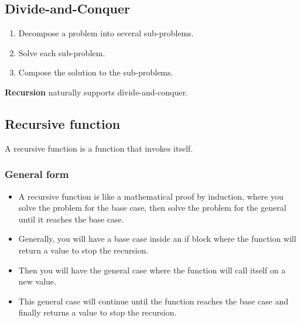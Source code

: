 \documentclass[11pt]{article}
\begin{document}
\subsection{Divide-and-Conquer}
\label{sec:org57e7adb}
\begin{enumerate}
\item Decompose a problem into several sub-problems.
\item Solve each sub-problem.
\item Compose the solution to the sub-problems.
\end{enumerate}

\textbf{Recursion} naturally supports divide-and-conquer.

\subsection{Recursive function}
\label{sec:org7423c1e}
A recursive function is a function that invokes itself.

\subsubsection{General form}
\label{sec:orge83c0e7}
\begin{itemize}
\item A recursive function is like a mathematical proof by induction, where you solve the problem for the base case, then solve the problem for the general until it reaches the base case.
\item Generally, you will have a base case inside an if block where the function will return a value to stop the recursion.
\item Then you will have the general case where the function will call itself on a new value.
\item This general case will continue until the function reaches the base case and finally returns a value to stop the recursion.
\end{itemize}
\end{document}
